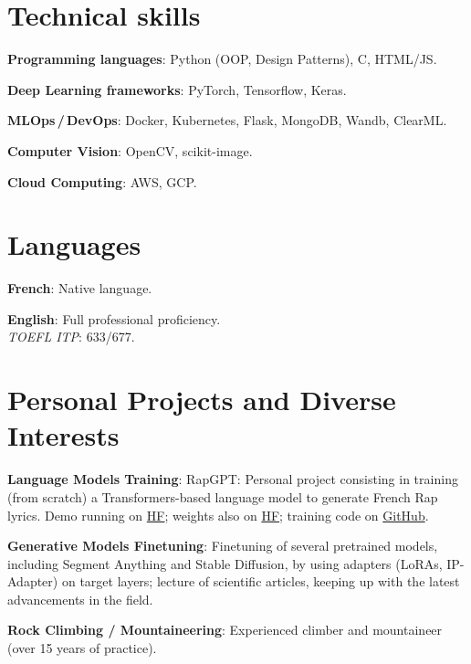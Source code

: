 \documentclass[letterpaper,10pt]{article}
\newcommand{\resumeItem}[2]{
  \item\small{
    \textbf{#1}{: #2\vspace{-0.8pt}}
  }
}
\newcommand{\resumeSubItem}[2]{
    \small{\resumeItem{#1}{#2}\vspace{-4pt}}
	}
\newcommand{\resumeSubHeadingListStart}{\begin{itemize}[leftmargin=*]}
\newcommand{\resumeSubHeadingListEnd}{\end{itemize}}
\begin{document}
\begin{minipage}[t]{0.6\linewidth}
    \section{Technical skills}
    \resumeSubHeadingListStart
    \resumeSubItem{Programming languages}{Python (OOP, Design Patterns), C, HTML/JS.}
    \resumeSubItem{Deep Learning frameworks}{PyTorch, Tensorflow, Keras.}
    \resumeSubItem{MLOps\,/\,DevOps}{Docker, Kubernetes, Flask, MongoDB, Wandb, ClearML.}
    \resumeSubItem{Computer Vision}{OpenCV, scikit-image.}
    \resumeSubItem{Cloud Computing}{AWS, GCP.}
    \resumeSubHeadingListEnd
\end{minipage}
\hfill
\begin{minipage}[t]{0.37\linewidth}
    \section{Languages}
    \resumeSubHeadingListStart
    \resumeSubItem{French}{Native language.}
    \resumeSubItem{English}{Full professional proficiency. \\ \emph{TOEFL ITP}: 633/677.}
    \resumeSubHeadingListEnd
\end{minipage}



\section{Personal Projects and Diverse Interests}
\vspace{0.5mm}
\begin{minipage}[t]{0.9865\textwidth}
\resumeSubHeadingListStart
\resumeSubItem{Language Models Training}{RapGPT: Personal project consisting in training (from scratch) a Transformers-based language model to generate French Rap lyrics. 
Demo running on \href{https://huggingface.co/spaces/hugojarkoff/rapGPT}{HF}; weights also on \href{https://huggingface.co/hugojarkoff/rapGPT}{HF}; training code on \href{https://github.com/hugojarkoff/rapGPT}{GitHub}.}
\resumeSubItem{Generative Models Finetuning}{Finetuning of several pretrained models, including Segment Anything and Stable Diffusion, by using adapters (LoRAs, IP-Adapter) on target layers; lecture of scientific articles, keeping up with the latest advancements in the field.}
\resumeSubItem{Rock Climbing / Mountaineering}{Experienced climber and mountaineer (over 15 years of practice).}
\resumeSubHeadingListEnd
\end{minipage}







\end{document}
